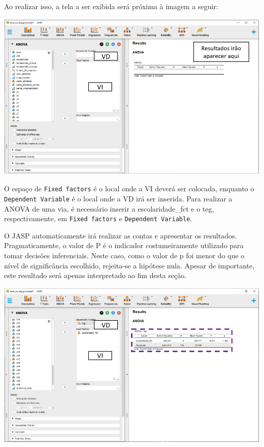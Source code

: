 \documentclass[
]{book}
\begin{document}
Ao realizar isso, a tela a ser exibida será próxima à imagem a seguir:

\includegraphics{./img/cap_anova_interface2.png}

O espaço de \texttt{Fixed\ factors} é o local onde a VI deverá ser colocada, enquanto o \texttt{Dependent\ Variable} é o local onde a VD irá ser inserida. Para realizar a ANOVA de uma via, é necessário inserir a escolaridade\_fct e o teg, respectivamente, em \texttt{Fixed\ factors} e \texttt{Dependent\ Variable}.

O JASP automaticamente irá realizar as contas e apresentar os resultados. Pragmaticamente, o valor de P é o indicador costumeiramente utilizado para tomar decisões inferenciais. Neste caso, como o valor de p foi menor do que o nível de significância escolhido, rejeita-se a hipótese nula. Apesar de importante, este resultado será apenas interpretado ao fim desta seção.

\includegraphics{./img/cap_anova_resultados_iniciais.png}
\end{document}
